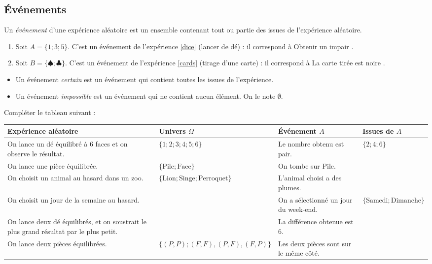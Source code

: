 \documentclass{article}
\begin{document}
\subsection{\'Evénements}
\begin{definitionbox}
Un \emph{événement} d'une expérience aléatoire est un ensemble contenant tout ou partie des issues de l'expérience aléatoire.
\end{definitionbox}
\begin{example}
\begin{enumerate}
\item Soit $A = \{1;3;5\}$. C'est un événement de l'expérience \ref{dice} (lancer de dé) : il correspond à \og Obtenir un impair \fg.
\item Soit $B = \{♠;♣\}$. C'est un événement de l'expérience \ref{cards} (tirage d'une carte) : il correspond à \og La carte tirée est noire \fg.
\end{enumerate}
\end{example}
\begin{vocabulary}
\begin{itemize}
\item Un événement \emph{certain} est un événement qui contient toutes les issues de l'expérience.  
\item Un événement \emph{impossible} est un événement qui ne contient aucun élément. On le note $\emptyset$.
\end{itemize}
\end{vocabulary}
\begin{exercize}
Compléter le tableau suivant :
\begin{center}
\begin{tabular}{|C{0.25\textwidth}|C{0.3\textwidth}|C{0.2\textwidth}|C{0.2\textwidth}|}
\hline
Expérience aléatoire & Univers $\Omega$ & \'Evénement $A$ & Issues de $A$ \\
\hline
On lance un dé équilibré à $6$ faces et on observe le résultat. & $\{1;2;3;4;5;6\}$ & Le nombre obtenu est pair. & $\{2;4;6\}$ \\
\hline
On lance une pièce équilibrée. & $\{\text{Pile};\text{Face}\}$ & On tombe sur Pile. & \\
\hline
On choisit un animal au hasard dans un zoo. & $\{\text{Lion};\text{Singe};\text{Perroquet}\}$ & L'animal choisi a des plumes. & \\
\hline
On choisit un jour de la semaine au hasard. & & On a sélectionné un jour du week-end. & $\{\text{Samedi};\text{Dimanche}\}$\\
\hline
On lance deux dé équilibrés, et on soustrait le plus grand résultat par le plus petit. & & La différence obtenue est $6$. & \\
\hline
On lance deux pièces équilibrées. & $\{(P,P);(F,F),(P,F),(F,P)\}$ & Les deux pièces sont sur le même côté. & \\
\hline 
\end{tabular}
\end{center}
\end{exercize}
\newpage
\end{document}
